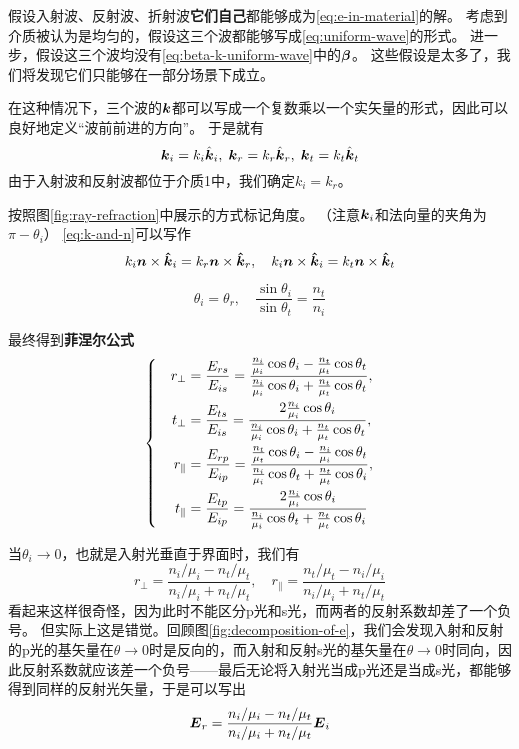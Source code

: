 \documentclass[UTF8, a4paper]{ctexart}
\newenvironment{bigcase}{\left\{\quad\begin{aligned}}{\end{aligned}\right.}
\begin{document}
假设入射波、反射波、折射波\textbf{它们自己}都能够成为\eqref{eq:e-in-material}的解。
考虑到介质被认为是均匀的，假设这三个波都能够写成\eqref{eq:uniform-wave}的形式。
进一步，假设这三个波均没有\eqref{eq:beta-k-uniform-wave}中的$\vb*{\beta}$。
这些假设是太多了，我们将发现它们只能够在一部分场景下成立。

在这种情况下，三个波的$\vb*{k}$都可以写成一个复数乘以一个实矢量的形式，因此可以良好地定义“波前前进的方向”。
于是就有
\[
    \vb*{k}_i = k_i \hat{\vb*{k}}_i, \; \vb*{k}_r = k_r \hat{\vb*{k}}_r, \; \vb*{k}_t = k_t \hat{\vb*{k}}_t
\]
由于入射波和反射波都位于介质1中，我们确定$k_i=k_r$。

按照图\ref{fig:ray-refraction}中展示的方式标记角度。
（注意$\vb*{k}_i$和法向量的夹角为$\pi-\theta_i$）
\eqref{eq:k-and-n}可以写作
\[
    k_i \vb*{n} \times \vu*{k}_i = k_r \vb*{n} \times \vu*{k}_r, \quad k_i \vb*{n} \times \vu*{k}_i = k_t \vb*{n} \times \vu*{k}_t
\]

\begin{equation}
    \theta_i = \theta_r, \quad \frac{\sin \theta_i}{\sin \theta_t} = \frac{n_t}{n_i}
    \label{eq:snell}
\end{equation}

最终得到\textbf{菲涅尔公式}
\begin{equation}
    \begin{bigcase}
        r_\bot &= \frac{E_{rs}}{E_{is}} = 
        \frac{\frac{n_i}{\mu_i} \cos \theta_i - \frac{n_t}{\mu_t} \cos \theta_t}{\frac{n_i}{\mu_i} \cos \theta_i + \frac{n_t}{\mu_t} \cos \theta_t}, \\
        t_\bot &= \frac{E_{ts}}{E_{is}} = 
        \frac{2 \frac{n_i}{\mu_i} \cos \theta_i}{\frac{n_i}{\mu_i} \cos \theta_i + \frac{n_t}{\mu_t} \cos \theta_t}, \\
        r_\parallel &= \frac{E_{rp}}{E_{ip}} = 
        \frac{\frac{n_t}{\mu_t} \cos \theta_i - \frac{n_i}{\mu_i} \cos \theta_t}{\frac{n_i}{\mu_i} \cos \theta_t + \frac{n_t}{\mu_t} \cos \theta_i}, \\
        t_\parallel &= \frac{E_{tp}}{E_{ip}} =
        \frac{2 \frac{n_i}{\mu_i} \cos \theta_i}{\frac{n_i}{\mu_i} \cos \theta_t + \frac{n_t}{\mu_t} \cos \theta_i}
    \end{bigcase}
    \label{eq:fresnel-formulas}
\end{equation}

当$\theta_i \to 0$，也就是入射光垂直于界面时，我们有
\begin{equation}
    r_\bot = \frac{n_i / \mu_i - n_t / \mu_t}{n_i / \mu_i + n_t / \mu_t}, \quad 
    r_\parallel = \frac{n_t / \mu_t - n_i / \mu_i}{n_i / \mu_i + n_t / \mu_t}
\end{equation}
看起来这样很奇怪，因为此时不能区分p光和s光，而两者的反射系数却差了一个负号。
但实际上这是错觉。回顾图\ref{fig:decomposition-of-e}，我们会发现入射和反射的p光的基矢量在$\theta \to 0$时是反向的，而入射和反射s光的基矢量在$\theta \to 0$时同向，因此反射系数就应该差一个负号——最后无论将入射光当成p光还是当成s光，都能够得到同样的反射光矢量，于是可以写出
\begin{equation}
    \vb*{E}_r = \frac{n_i / \mu_i - n_t / \mu_t}{n_i / \mu_i + n_t / \mu_t} \vb*{E}_i
\end{equation}
\end{document}
